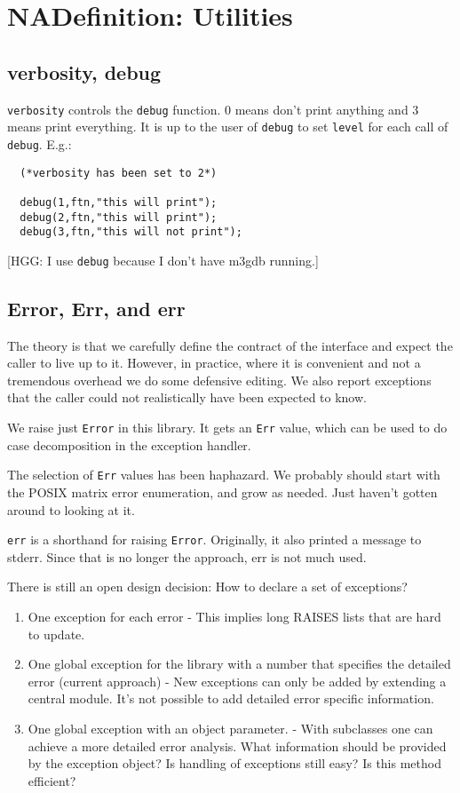 \section{NADefinition: Utilities}

\subsection*{verbosity, debug}
{\tt verbosity} controls the {\tt debug} function.
0 means don't print anything and 3 means print everything.
It is up to the user of {\tt debug} to
set {\tt level} for each call of {\tt debug}.  E.g.:

\begin {tt} \begin{verbatim}
  (*verbosity has been set to 2*)

  debug(1,ftn,"this will print");
  debug(2,ftn,"this will print");
  debug(3,ftn,"this will not print");
\end{verbatim} \end{tt}

[HGG: I use {\tt debug} because I don't have m3gdb running.]

\subsection*{Error, Err, and err}
The theory is that we carefully define the contract of the interface and
expect the caller to live up to it.  However, in practice, where
it is convenient and not a tremendous overhead we do some defensive
editing.  We also report exceptions that the caller could not
realistically have been expected to know.

We raise just {\tt Error} in this library.
It gets an {\tt Err} value, which can be
used to do case decomposition in the exception handler.

The selection of {\tt Err} values has been haphazard.  We probably should
start with the POSIX matrix error enumeration, and grow as needed.
Just haven't gotten around to looking at it.

{\tt err} is a shorthand for raising {\tt Error}.
Originally, it also printed
a message to stderr. Since that is no longer the approach, err is not
much used.


There is still an open design decision:
How to declare a set of exceptions?
\begin{enumerate}
\item One exception for each error -
This implies long RAISES lists that are hard to update.
\item One global exception for the library with a number that specifies the detailed error (current approach) -
New exceptions can only be added by extending a central module.
It's not possible to add detailed error specific information.
\item One global exception with an object parameter. -
With subclasses one can achieve a more detailed error analysis.
What information should be provided by the exception object?
Is handling of exceptions still easy?
Is this method efficient?
\end{enumerate}

